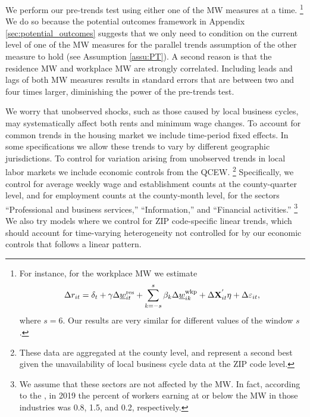 We perform our pre-trends test using either one of the MW measures at a time.%
\footnote{For instance, for the workplace MW we estimate
\begin{equation*}
    \Delta r_{it} = \delta_t
                  + \gamma \Delta \underline{w}^{\text{res}}_{it} 
                  + \sum_{k=-s}^{s} \beta_k \Delta \underline{w}^{\text{wkp}}_{ik}
                  + \Delta \mathbf{X}^{'}_{it}\eta
                  + \Delta \varepsilon_{it} ,
\end{equation*}
where $s=6$.
Our results are very similar for different values of the window $s$.}
We do so because the potential outcomes framework in Appendix 
\ref{sec:potential_outcomes} suggests that we only need to condition on the
current level of one of the MW measures for the parallel trends assumption
of the other measure to hold (see Assumption \ref{assu:PT}).
A second reason is that the residence MW and workplace MW are strongly 
correlated.
Including leads and lags of both MW measures results in standard errors
that are between two and four times larger, diminishing the power of the 
pre-trends test.

We worry that unobserved shocks, such as those caused by local business cycles, 
may systematically affect both rents and minimum wage changes.
To account for common trends in the housing market we include time-period 
fixed effects.
In some specifications we allow these trends to vary by different geographic 
jurisdictions.
To control for variation arising from unobserved trends in local labor markets 
we include economic controls from the QCEW.%
\footnote{These data are aggregated at the county level, and represent a second 
best given the unavailability of local business cycle data at the ZIP code 
level.}
Specifically, we control for average weekly wage and establishment counts at the 
county-quarter level, and for employment counts at the county-month level, 
for the sectors ``Professional and business services,'' ``Information,'' and 
``Financial activities.''%
\footnote{We assume that these sectors are not affected by the MW.
In fact, according to the \textcite[][Table 5]{MinWorkersReportBLS}, in 
2019 the percent of workers earning at or below the MW in those 
industries was 0.8, 1.5, and 0.2, respectively.}
We also try models where we control for ZIP code-specific linear
trends, which should account for time-varying heterogeneity not controlled for 
by our economic controls that follows a linear pattern.

